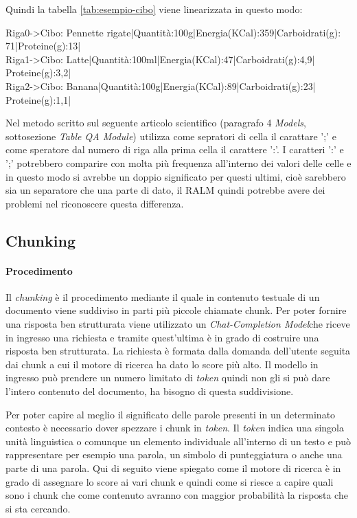 Quindi la tabella \ref{tab:esempio-cibo} viene linearizzata in questo modo:
\begin{tcolorbox}[colback=white, colframe=black]
    Riga0->Cibo: Pennette rigate|Quantità:100g|Energia(KCal):359|Carboidrati(g): \\
    71|Proteine(g):13| \\
    Riga1->Cibo: Latte|Quantità:100ml|Energia(KCal):47|Carboidrati(g):4,9|\\
    Proteine(g):3,2| \\
    Riga2->Cibo: Banana|Quantità:100g|Energia(KCal):89|Carboidrati(g):23|\\
    Proteine(g):1,1|
\end{tcolorbox}

Nel metodo scritto sul seguente articolo scientifico \cite{art:multimodelqa} (paragrafo 4 \emph{Models}, sottosezione \emph{Table QA Module}) utilizza come sepratori di cella il carattare ';' e come speratore dal numero di riga alla prima cella il carattere ':'.
I caratteri ':' e ';' potrebbero comparire con molta più frequenza all'interno dei valori delle celle e in questo modo si avrebbe un doppio significato per questi ultimi, cioè sarebbero sia un separatore che una parte di dato, il RALM quindi potrebbe avere dei problemi nel riconoscere questa differenza. 



\subsection{Chunking}
\paragraph{Procedimento}
Il \emph{chunking} è il procedimento mediante il quale in contenuto testuale di un documento viene suddiviso in parti più piccole chiamate chunk.
\noindent Per poter fornire una risposta ben strutturata viene utilizzato un \emph{\gls{Chat-Completion Model}}\glsfirstoccur che riceve in ingresso una richiesta e tramite quest'ultima è in grado di costruire una risposta ben strutturata.
La richiesta è formata dalla domanda dell'utente seguita dai chunk a cui il motore di ricerca ha dato lo score più alto.
Il modello in ingresso può prendere un numero limitato di \emph{token} quindi non gli si può dare l'intero contenuto del documento, ha bisogno di questa suddivisione.

\noindent Per poter capire al meglio il significato delle parole presenti in un determinato contesto è necessario dover spezzare i chunk in \emph{token}.
Il \emph{token} indica una singola unità linguistica o comunque un elemento individuale all'interno di un testo e può rappresentare per esempio una parola, un simbolo di punteggiatura o anche una parte di una parola.
Qui di seguito viene spiegato come il motore di ricerca è in grado di assegnare lo score ai vari chunk e quindi come si riesce a capire quali sono i chunk che come contenuto avranno con maggior probabilità la risposta che si sta cercando.

